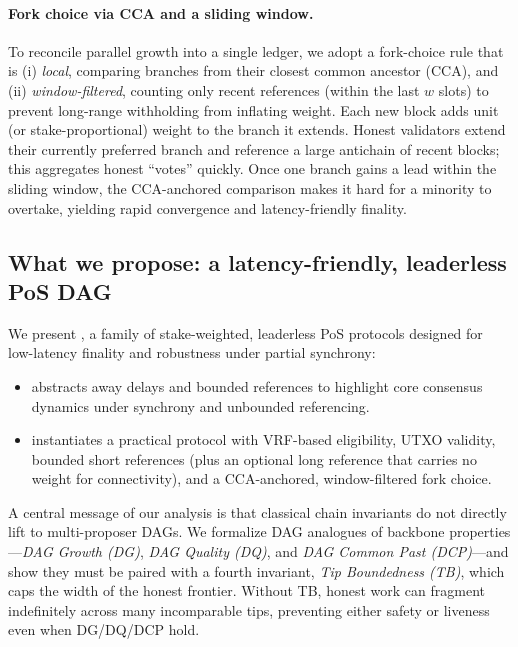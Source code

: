 \paragraph{Fork choice via CCA and a sliding window.}
To reconcile parallel growth into a single ledger, we adopt a fork-choice rule that is (i) \emph{local}, comparing branches from their closest common ancestor (CCA), and (ii) \emph{window-filtered}, counting only recent references (within the last $w$ slots) to prevent long-range withholding from inflating weight. Each new block adds unit (or stake-proportional) weight to the branch it extends. Honest validators extend their currently preferred branch and reference a large antichain of recent blocks; this aggregates honest “votes” quickly. Once one branch gains a lead within the sliding window, the CCA-anchored comparison makes it hard for a minority to overtake, yielding rapid convergence and latency-friendly finality.

\subsection{What we propose: a latency-friendly, leaderless PoS DAG} 
We present \Proj, a family of stake-weighted, leaderless PoS protocols designed for low-latency finality and robustness under partial synchrony:
\begin{itemize}
\item \textbf{\ProjIdeal} abstracts away delays and bounded references to highlight core consensus dynamics under synchrony and unbounded referencing.
\item \textbf{\ProjBase} instantiates a practical protocol with VRF-based eligibility, UTXO validity, bounded short references (plus an optional long reference that carries no weight for connectivity), and a CCA-anchored, window-filtered fork choice.
\end{itemize}
A central message of our analysis is that classical chain invariants do not directly lift to multi-proposer DAGs. We formalize DAG analogues of backbone properties---\emph{DAG Growth (DG)}, \emph{DAG Quality (DQ)}, and \emph{DAG Common Past (DCP)}---and show they must be paired with a fourth invariant, \emph{Tip Boundedness (TB)}, which caps the width of the honest frontier. Without TB, honest work can fragment indefinitely across many incomparable tips, preventing either safety or liveness even when DG/DQ/DCP hold.

